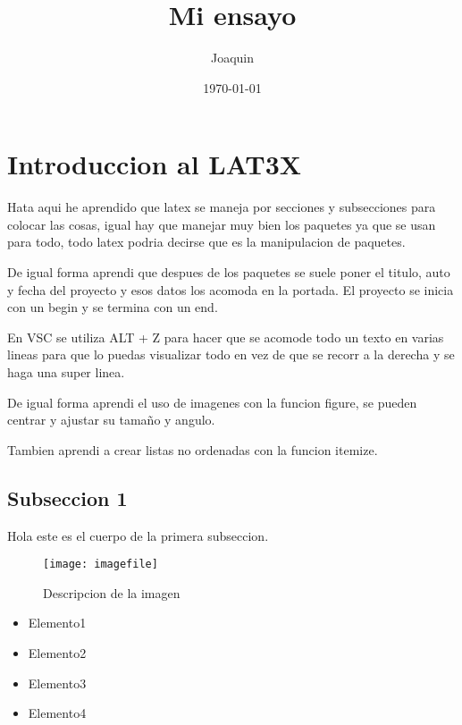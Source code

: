 \documentclass[letterpaper]{article} %
\title{Mi ensayo}
\author{Joaquin}
\date{\today}
\begin{document}
\maketitle
\section*{Introduccion al LAT3X}
\leftskip=15pt %
\rightskipp=0pt %
\parindent=0pt %
Hata aqui he aprendido que latex se maneja por secciones y subsecciones para colocar las cosas, igual hay que manejar muy bien los paquetes ya que se usan para todo, todo latex podria decirse que es la manipulacion de paquetes.

De igual forma aprendi que despues de los paquetes se suele poner el titulo, auto y fecha del proyecto y esos datos los acomoda en la portada. El proyecto se inicia con un begin y se termina con un end.

En VSC se utiliza ALT + Z para hacer que se acomode todo un texto en varias lineas para que lo puedas visualizar todo en vez de que se recorr a la derecha y se haga una super linea.

De igual forma aprendi el uso de imagenes con la funcion figure, se pueden centrar y ajustar su tamaño y angulo.

Tambien aprendi a crear listas no ordenadas con la funcion itemize.

\subsection*{Subseccion 1}
Hola este es el cuerpo de la primera subseccion.
\begin{figure}[h]
    \centering
    \texttt{[image: imagefile]}
    \caption{Descripcion de la imagen}
\end{figure}
\begin{itemize}
    \item Elemento1
    \item Elemento2
    \item Elemento3
    \item Elemento4
\end{itemize}
\end{document}
